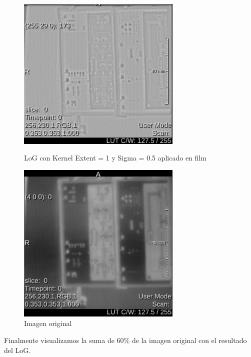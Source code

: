 \documentclass{article}
\begin{document}
\begin{figure}[ht]
\centering
\begin{minipage}{.5\textwidth}
  \centering
    \includegraphics[width=0.7\textwidth]{3Laplaciano/3_film_LoG.png} %
    \caption{LoG con Kernel Extent = 1 y Sigma = 0.5 aplicado en film}
\end{minipage}%
\begin{minipage}{.5\textwidth}
  \centering
  \includegraphics[width=0.7\textwidth]{3Laplaciano/3_film_orig.png}
  \caption{Imagen original}
\end{minipage}
\end{figure}
\FloatBarrier

Finalmente visualizamos la suma de 60\% de la imagen original con el resultado del LoG. 
\end{document}
